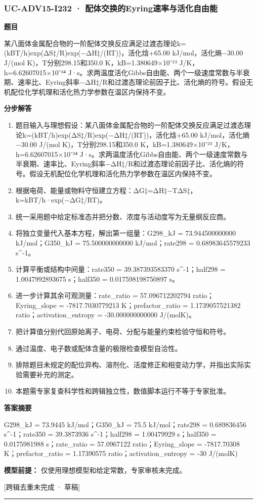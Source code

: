 \documentclass[UTF8,11pt,a4paper]{ctexart}
\begin{document}
\subsubsection*{UC-ADV15-I232 · 配体交换的Eyring速率与活化自由能}
\noindent\textbf{题目}\par
某八面体金属配合物的一阶配体交换反应满足过渡态理论k=(kBT/h)exp(ΔS‡/R)exp(−ΔH‡/(RT))，活化焓+65.00 kJ/mol，活化熵−30.00 J/(mol K)，T分别298.15和350.0 K，kB=1.380649×10⁻²³ J/K，h=6.62607015×10⁻³⁴ J·s。求两温度活化Gibbs自由能、两个一级速度常数与半衰期、速率比、Eyring斜率−ΔH‡/R和过渡态理论前因子比、活化熵的符号。假设无机配位化学机理和活化热力学参数在温区内保持不变。\par
\medskip\noindent\textbf{分步解答}
\begin{enumerate}
\item 题目输入与理想假设：某八面体金属配合物的一阶配体交换反应满足过渡态理论k=(kBT/h)exp(ΔS‡/R)exp(−ΔH‡/(RT))，活化焓+65.00 kJ/mol，活化熵−30.00 J/(mol K)，T分别298.15和350.0 K，kB=1.380649×10⁻²³ J/K，h=6.62607015×10⁻³⁴ J·s。求两温度活化Gibbs自由能、两个一级速度常数与半衰期、速率比、Eyring斜率−ΔH‡/R和过渡态理论前因子比、活化熵的符号。假设无机配位化学机理和活化热力学参数在温区内保持不变。
\item 根据电荷、能量或物料守恒建立方程：ΔG‡=ΔH‡−TΔS‡，k=kBT/h·exp(−ΔG‡/RT)。
\item 统一采用题中给定标准态并把分数、浓度与活动度写为无量纲反应商。
\item 将独立变量代入基本方程，解出第一组量：G298\_kJ = 73.944500000000 kJ/mol；G350\_kJ = 75.500000000000 kJ/mol；rate298 = 0.68983645579233 s\textasciicircum{}-1。
\item 计算平衡或结构中间量：rate350 = 39.387393583370 s\textasciicircum{}-1；half298 = 1.0047992893675 s；half350 = 0.017598198750897 s。
\item 进一步计算其余可观测量：rate\_ratio = 57.096712202794 ratio；Eyring\_slope = -7817.7030779213 K；prefactor\_ratio = 1.1739057521382 ratio；activation\_entropy = -30.000000000000 J/(molK)。
\item 把计算值分别代回原始离子、电荷、分配与能量约束检验守恒和符号。
\item 通过温度、电子数或配体含量的极限检查模型自洽性。
\item 排除题目未规定的配位异构、溶剂化、活度修正和相变动力学，并指出实际实验需要补充的测定。
\item 本题需专家复查科学性和跨辑独立性，数值脚本运行不等于专家批准。
\end{enumerate}
\noindent\textbf{答案摘要}\par
G298\_kJ = 73.9445 kJ/mol；G350\_kJ = 75.5 kJ/mol；rate298 = 0.689836456 s\textasciicircum{}-1；rate350 = 39.3873936 s\textasciicircum{}-1；half298 = 1.00479929 s；half350 = 0.0175981988 s；rate\_ratio = 57.0967122 ratio；Eyring\_slope = -7817.70308 K；prefactor\_ratio = 1.17390575 ratio；activation\_entropy = -30 J/(molK)\par
\noindent\textbf{模型前提：}
仅使用理想模型和给定常数，专家审核未完成。\par
\noindent\textcolor{red!65!black}{[跨辑去重未完成 · 草稿]} \par
\medskip\hrule\medskip
{}
\end{document}
